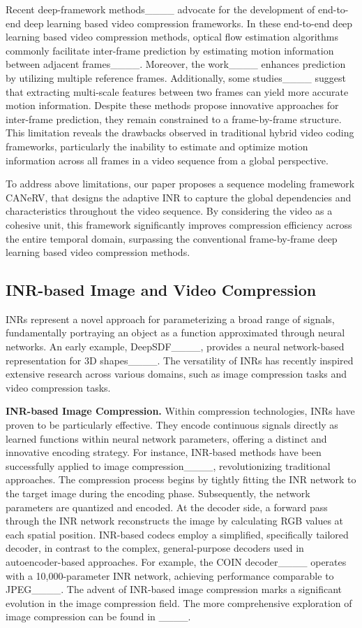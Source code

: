 Recent deep-framework methods____ advocate for the development of end-to-end deep learning based video compression frameworks. In these end-to-end deep learning based video compression methods, optical flow estimation algorithms commonly facilitate inter-frame prediction by estimating motion information between adjacent frames____. Moreover, the work____ enhances prediction by utilizing multiple reference frames. Additionally, some studies____ suggest that extracting multi-scale features between two frames can yield more accurate motion information. Despite these methods propose innovative approaches for inter-frame prediction, they remain constrained to a frame-by-frame structure. This limitation reveals the drawbacks observed in traditional hybrid video coding frameworks, particularly the inability to estimate and optimize motion information across all frames in a video sequence from a global perspective.

To address above limitations, our paper proposes a sequence modeling framework CANeRV, that designs the adaptive INR to capture the global dependencies and characteristics throughout the video sequence. By considering the video as a cohesive unit, this framework significantly improves compression efficiency across the entire temporal domain, surpassing the conventional frame-by-frame deep learning based video compression methods.

\subsection{INR-based Image and Video Compression}
INRs represent a novel approach for parameterizing a broad range of signals, fundamentally portraying an object as a function approximated through neural networks. An early example, DeepSDF____, provides a neural network-based representation for 3D shapes____. The versatility of INRs has recently inspired extensive research across various domains, such as image compression tasks and video compression tasks.

\noindent \textbf{INR-based Image Compression.}
Within compression technologies, INRs have proven to be particularly effective. 
They encode continuous signals directly as learned functions within neural network parameters, offering a distinct and innovative encoding strategy. For instance, INR-based methods have been successfully applied to image compression____, revolutionizing traditional approaches. The compression process begins by tightly fitting the INR network to the target image during the encoding phase. Subsequently, the network parameters are quantized and encoded. At the decoder side, a forward pass through the INR network reconstructs the image by calculating RGB values at each spatial position. INR-based codecs employ a simplified, specifically tailored decoder, in contrast to the complex, general-purpose decoders used in autoencoder-based approaches. For example, the COIN decoder____ operates with a 10,000-parameter INR network, achieving performance comparable to JPEG____. The advent of INR-based image compression marks a significant evolution in the image compression field. 
The more comprehensive exploration of image compression can be found in ____.

